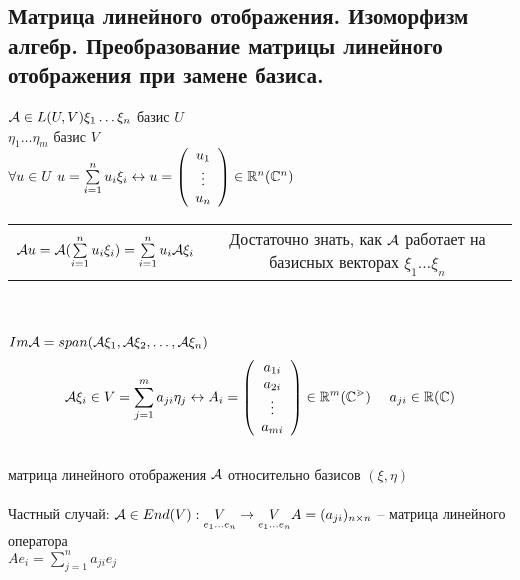 \documentclass[../spring.tex]{subfiles}
\begin{document}
	\subsection{Матрица линейного отображения. Изоморфизм алгебр. Преобразование матрицы линейного отображения при замене базиса.}
	$\mathcal{A} \in L(U, V)\\
	\xi_1 \ldots \xi_n$ базис $U$\\
	$\eta_1 \ldots \eta_m$ базис $V$\\
	$\forall u \in U \ u = \sum\limits_{i=1}^{n} u_i\xi_i \leftrightarrow u = \left(
	\begin{array}{c}
	u_1 \\
	\vdots\\
	u_n 
	\end{array} \right)
	\in \mathbb R^n(\mathbb{C}^n)$\\
	\begin{tabular}{cc}
		$\mathcal{A} u = \mathcal{A}(\sum\limits_{i = 1}^{n}u_i\xi_i) = \sum\limits_{i=1}^{n}u_i\mathcal{A}\xi_i$ &
		Достаточно знать, как $\mathcal{A}$ работает на базисных векторах $\xi_1\ldots\xi_n$
	\end{tabular}\\ \\
	$Im\mathcal{A} = span(\mathcal{A}\xi_1, \mathcal{A}\xi_2, \ldots, \mathcal{A}\xi_n)$\\
	$$\A\xi_i \in V = \sum_{j=1}^{m}a_{ji}\eta_j \leftrightarrow A_i = \left(
	\begin{array}{c}
	a_{1i}\\
	a_{2i}\\
	\vdots\\
	a_{mi}
	\end{array}\right)
	\in \R^m(\mathbb{C^m})\ \ \ \ 
	a_{ji} \in \R(\mathbb{C})
	$$\\
	матрица линейного отображения $\mathcal{A}$ относительно базисов $(\xi, \eta)$\\\\
	Частный случай: $\mathcal{A}\in End(V): \underset{e_1\ldots e_n}{V} \rightarrow \underset{e_1\ldots e_n}{V}\\
	A = (a_{ji})_{n\times n}$ -- матрица линейного оператора\\
	$A e_i = \sum\limits_{j=1}^{n}a_{ji}e_j$
\end{document}
